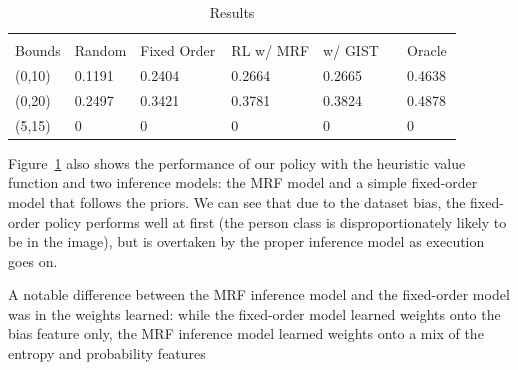 \begin{figure}[h!]
\centering
{} \hfill
{}
  \label{fig:results1}
\end{figure}

\begin{table}[t]
\caption{Results}
\label{tab:results}
\begin{center}
\begin{tabular}{|l|l|l|l|l|l|}
\\ \hline \\
Bounds & Random & Fixed Order & RL w/ MRF & w/ GIST   & Oracle \\ \hline
(0,10) & 0.1191 & 0.2404      & 0.2664    & 0.2665    & 0.4638 \\ 
(0,20) & 0.2497 & 0.3421      & 0.3781    & 0.3824    & 0.4878 \\ 
(5,15) & 0      & 0           & 0         & 0         & 0      \\
\end{tabular}
\end{center}
\end{table}

Figure~\ref{fig:results1} also shows the performance of our policy with the heuristic value function and two inference models: the MRF model and a simple fixed-order model that follows the priors.
We can see that due to the dataset bias, the fixed-order policy performs well at first (the person class is disproportionately likely to be in the image), but is overtaken by the proper inference model as execution goes on.

A notable difference between the MRF inference model and the fixed-order model was in the weights learned: while the fixed-order model learned weights onto the bias feature only, the MRF inference model learned weights onto a mix of the entropy and probability features
